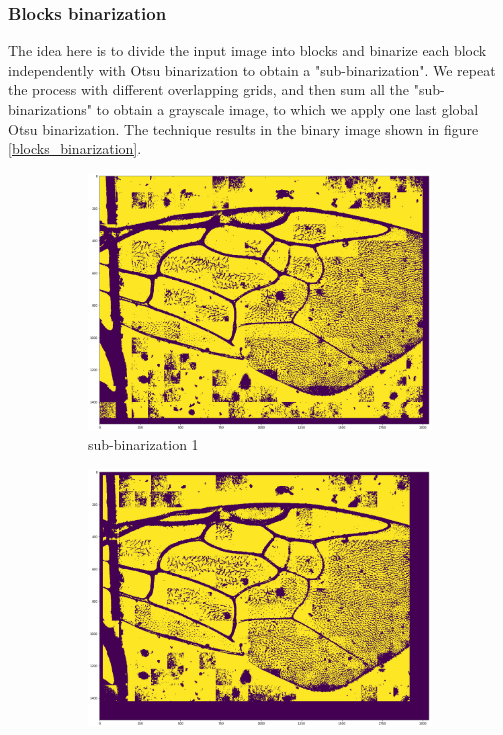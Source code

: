 \documentclass[a4paper]{article}
\begin{document}
\subsubsection{Blocks binarization}

The idea here is to divide the input image into blocks and binarize each block independently with Otsu binarization to obtain a "sub-binarization". We repeat the process with different overlapping grids, and then sum all the "sub-binarizations" to obtain a grayscale image, to which we apply one last global Otsu binarization. 
The technique results in the binary image shown in figure \ref{blocks_binarization}.

\begin{figure}[H]
\begin{subfigure}{.5\textwidth}
    \centering
    \includegraphics[width=\textwidth]{figures/sub_blocks.png}
    \caption{sub-binarization 1}
\end{subfigure}
\begin{subfigure}{.5\textwidth}
    \centering
    \includegraphics[width=\textwidth]{figures/sub_blocks2.png}

\end{subfigure}
\end{figure}
\end{document}

